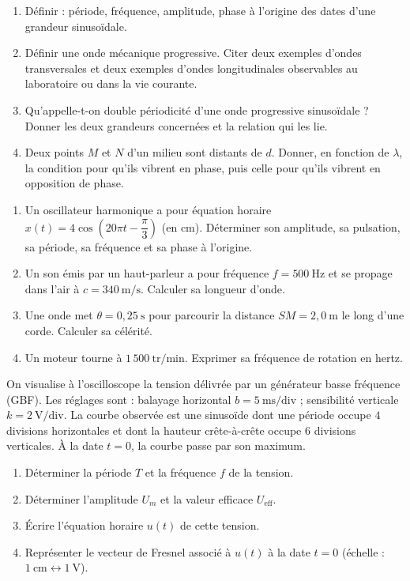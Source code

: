 \documentclass[11pt]{article}
\newcommand{\cle}[1]{{\popxbold\color{popdark}#1}}
\newcounter{popsec}
\newcounter{popsub}
\newcommand{\courssub}[1]{%
  \stepcounter{popsub}%
  \par\vspace{9pt}\noindent{\popxbold\fontsize{11.5}{13}\selectfont\color{popink}{\color{poporange}\thepopsec.\thepopsub}\hspace{6pt}#1}\par\nopagebreak\vspace{4pt}
}
\begin{document}
\begin{exercice}
\begin{enumerate}
\item Définir : période, fréquence, amplitude, phase à l'origine des dates d'une grandeur sinusoïdale.
\item Définir une onde mécanique progressive. Citer deux exemples d'ondes transversales et deux exemples d'ondes longitudinales observables au laboratoire ou dans la vie courante.
\item Qu'appelle-t-on \cle{double périodicité} d'une onde progressive sinusoïdale ? Donner les deux grandeurs concernées et la relation qui les lie.
\item Deux points $M$ et $N$ d'un milieu sont distants de $d$. Donner, en fonction de $\lambda$, la condition pour qu'ils vibrent en phase, puis celle pour qu'ils vibrent en opposition de phase.
\end{enumerate}
\end{exercice}

\begin{exercice}
\begin{enumerate}
\item Un oscillateur harmonique a pour équation horaire $x(t) = 4\cos\left(20\pi t - \dfrac{\pi}{3}\right)$ (en cm). Déterminer son amplitude, sa pulsation, sa période, sa fréquence et sa phase à l'origine.
\item Un son émis par un haut-parleur a pour fréquence $f = 500\ \text{Hz}$ et se propage dans l'air à $c = 340\ \text{m/s}$. Calculer sa longueur d'onde.
\item Une onde met $\theta = 0{,}25\ \text{s}$ pour parcourir la distance $SM = 2{,}0\ \text{m}$ le long d'une corde. Calculer sa célérité.
\item Un moteur tourne à $1\,500\ \text{tr/min}$. Exprimer sa fréquence de rotation en hertz.
\end{enumerate}
\end{exercice}

\courssub{Je m'entraîne}

\begin{exercice}
On visualise à l'oscilloscope la tension délivrée par un générateur basse fréquence (GBF). Les réglages sont : balayage horizontal $b = 5\ \text{ms/div}$ ; sensibilité verticale $k = 2\ \text{V/div}$. La courbe observée est une sinusoïde dont une période occupe $4$ divisions horizontales et dont la hauteur crête-à-crête occupe $6$ divisions verticales. À la date $t = 0$, la courbe passe par son maximum.
\begin{enumerate}
\item Déterminer la période $T$ et la fréquence $f$ de la tension.
\item Déterminer l'amplitude $U_m$ et la valeur efficace $U_{\text{eff}}$.
\item Écrire l'équation horaire $u(t)$ de cette tension.
\item Représenter le vecteur de Fresnel associé à $u(t)$ à la date $t = 0$ (échelle : $1\ \text{cm} \leftrightarrow 1\ \text{V}$).
\end{enumerate}
\end{exercice}
\end{document}
